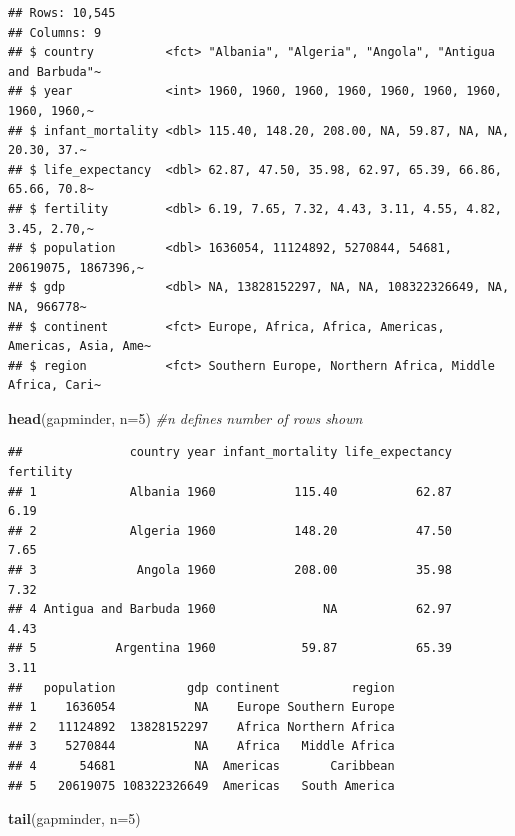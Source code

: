 \documentclass[
]{book}
\newenvironment{Shaded}{\begin{snugshade}}{\end{snugshade}}
\newcommand{\CommentTok}[1]{\textcolor[rgb]{0.56,0.35,0.01}{\textit{#1}}}
\newcommand{\DataTypeTok}[1]{\textcolor[rgb]{0.13,0.29,0.53}{#1}}
\newcommand{\DecValTok}[1]{\textcolor[rgb]{0.00,0.00,0.81}{#1}}
\newcommand{\KeywordTok}[1]{\textcolor[rgb]{0.13,0.29,0.53}{\textbf{#1}}}
\newcommand{\NormalTok}[1]{#1}
\begin{document}
\begin{verbatim}
## Rows: 10,545
## Columns: 9
## $ country          <fct> "Albania", "Algeria", "Angola", "Antigua and Barbuda"~
## $ year             <int> 1960, 1960, 1960, 1960, 1960, 1960, 1960, 1960, 1960,~
## $ infant_mortality <dbl> 115.40, 148.20, 208.00, NA, 59.87, NA, NA, 20.30, 37.~
## $ life_expectancy  <dbl> 62.87, 47.50, 35.98, 62.97, 65.39, 66.86, 65.66, 70.8~
## $ fertility        <dbl> 6.19, 7.65, 7.32, 4.43, 3.11, 4.55, 4.82, 3.45, 2.70,~
## $ population       <dbl> 1636054, 11124892, 5270844, 54681, 20619075, 1867396,~
## $ gdp              <dbl> NA, 13828152297, NA, NA, 108322326649, NA, NA, 966778~
## $ continent        <fct> Europe, Africa, Africa, Americas, Americas, Asia, Ame~
## $ region           <fct> Southern Europe, Northern Africa, Middle Africa, Cari~
\end{verbatim}

\begin{Shaded}
\begin{Highlighting}[]
\KeywordTok{head}\NormalTok{(gapminder, }\DataTypeTok{n=}\DecValTok{5}\NormalTok{) }\CommentTok{#n defines number of rows shown}
\end{Highlighting}
\end{Shaded}

\begin{verbatim}
##               country year infant_mortality life_expectancy fertility
## 1             Albania 1960           115.40           62.87      6.19
## 2             Algeria 1960           148.20           47.50      7.65
## 3              Angola 1960           208.00           35.98      7.32
## 4 Antigua and Barbuda 1960               NA           62.97      4.43
## 5           Argentina 1960            59.87           65.39      3.11
##   population          gdp continent          region
## 1    1636054           NA    Europe Southern Europe
## 2   11124892  13828152297    Africa Northern Africa
## 3    5270844           NA    Africa   Middle Africa
## 4      54681           NA  Americas       Caribbean
## 5   20619075 108322326649  Americas   South America
\end{verbatim}

\begin{Shaded}
\begin{Highlighting}[]
\KeywordTok{tail}\NormalTok{(gapminder, }\DataTypeTok{n=}\DecValTok{5}\NormalTok{)}
\end{Highlighting}
\end{Shaded}
\end{document}
